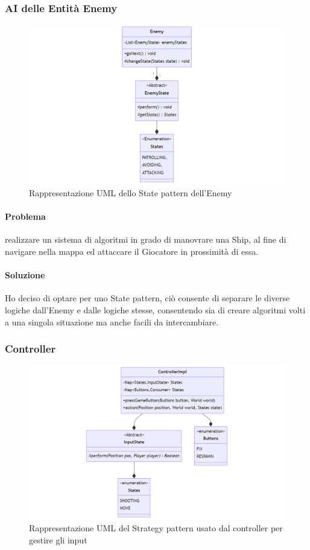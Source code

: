 \documentclass[a4paper,12pt]{report}
\begin{document}
\subsubsection*{AI delle Entità Enemy}
\begin{figure}[H]
	\centering{}
	\includegraphics[width=\textwidth]{img/Enemy.png}
	\caption{Rappresentazione UML dello State pattern dell'Enemy}
	\label{img:Enemy}
\end{figure}
\paragraph{Problema} realizzare un sistema di algoritmi in grado di manovrare una Ship, al fine di navigare nella mappa ed attaccare il Giocatore in prossimità di essa.
\paragraph{Soluzione} Ho deciso di optare per uno State pattern, ciò consente di separare le diverse logiche dall'Enemy e dalle logiche stesse, consentendo sia di creare algoritmi volti a una singola situazione ma anche facili da intercambiare.

\subsubsection*{Controller}
\begin{figure}[H]
	\centering{}
	\includegraphics[width=\textwidth]{img/Controller.png}
	\caption{Rappresentazione UML del Strategy pattern usato dal controller per gestire gli input}
	\label{img:Controller}
\end{figure}
\end{document}
